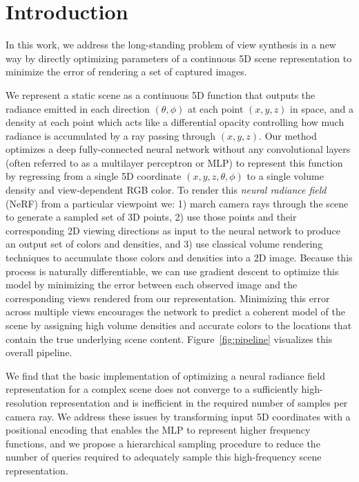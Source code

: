 \documentclass[runningheads]{llncs}
\newcommand{\angletheta}{\theta}
\newcommand{\anglephi}{\phi}
\begin{document}
\section{Introduction}

In this work, we address the long-standing problem of view synthesis in a new way by directly optimizing parameters of a continuous 5D scene representation to minimize the error of rendering a set of captured images. 

We represent a static scene as a continuous 5D function that outputs the radiance emitted in each direction $(\angletheta,\anglephi)$ at each point $(x,y,z)$ in space, and a density at each point which acts like a differential opacity controlling how much radiance is accumulated by a ray passing through $(x,y,z)$.
Our method optimizes a deep fully-connected neural network without any convolutional layers (often referred to as a multilayer perceptron or MLP) to represent this function by regressing from a single 5D coordinate $(x,y,z,\angletheta,\anglephi)$ to a single volume density and view-dependent RGB color. 
To render this \emph{neural radiance field} (NeRF) from a particular viewpoint we:
1) march camera rays through the scene to generate a sampled set of 3D points,
2) use those points and their corresponding 2D viewing directions as input to the neural network to produce an output set of colors and densities, and
3) use classical volume rendering techniques to accumulate those colors and densities into a 2D image.
Because this process is naturally differentiable, we can use gradient descent to optimize this model by minimizing the error between each observed image and the corresponding views rendered from our representation. Minimizing this error across multiple views encourages the network to predict a coherent model of the scene by assigning high volume densities and accurate colors to the locations that contain the true underlying scene content.
Figure~\ref{fig:pipeline} visualizes this overall pipeline.

We find that the basic implementation of optimizing a neural radiance field representation for a complex scene does not converge to a sufficiently high-resolution representation and is inefficient in the required number of samples per camera ray. We address these issues by transforming input 5D coordinates with a positional encoding that enables the MLP to represent higher frequency functions, and we propose a hierarchical sampling procedure to reduce the number of queries required to adequately sample this high-frequency scene representation.
\end{document}
